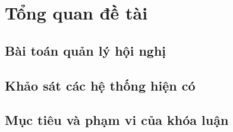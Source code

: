 \chapter{Tổng quan đề tài}
\section{Bài toán quản lý hội nghị}
\chuaviet
\section{Khảo sát các hệ thống hiện có}
\chuaviet
\section{Mục tiêu và phạm vi của khóa luận}
\chuaviet

